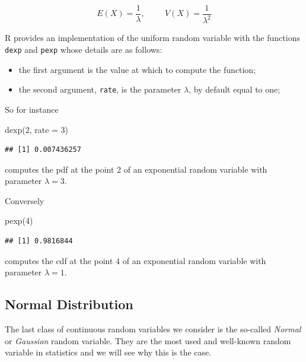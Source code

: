 \documentclass[
]{book}
\newenvironment{Shaded}{\begin{snugshade}}{\end{snugshade}}
\newcommand{\AttributeTok}[1]{\textcolor[rgb]{0.77,0.63,0.00}{#1}}
\newcommand{\DecValTok}[1]{\textcolor[rgb]{0.00,0.00,0.81}{#1}}
\newcommand{\FunctionTok}[1]{\textcolor[rgb]{0.00,0.00,0.00}{#1}}
\newcommand{\NormalTok}[1]{#1}
\begin{document}
\[
E(X)=\frac{1}{\lambda}, \hspace{1cm} V(X)=\frac{1}{\lambda^2}
\]

R provides an implementation of the uniform random variable with the functions \texttt{dexp} and \texttt{pexp} whose details are as follows:

\begin{itemize}
\item
  the first argument is the value at which to compute the function;
\item
  the second argument, \texttt{rate}, is the parameter \(\lambda\), by default equal to one;
\end{itemize}

So for instance

\begin{Shaded}
\begin{Highlighting}[]
\FunctionTok{dexp}\NormalTok{(}\DecValTok{2}\NormalTok{, }\AttributeTok{rate =} \DecValTok{3}\NormalTok{)}
\end{Highlighting}
\end{Shaded}

\begin{verbatim}
## [1] 0.007436257
\end{verbatim}

computes the pdf at the point 2 of an exponential random variable with parameter \(\lambda =3\).

Conversely

\begin{Shaded}
\begin{Highlighting}[]
\FunctionTok{pexp}\NormalTok{(}\DecValTok{4}\NormalTok{)}
\end{Highlighting}
\end{Shaded}

\begin{verbatim}
## [1] 0.9816844
\end{verbatim}

computes the cdf at the point 4 of an exponential random variable with parameter \(\lambda =1\).

\hypertarget{normal-distribution}{%
\subsection{Normal Distribution}\label{normal-distribution}}

The last class of continuous random variables we consider is the so-called \emph{Normal} or \emph{Gaussian} random variable. They are the most used and well-known random variable in statistics and we will see why this is the case.
\end{document}
